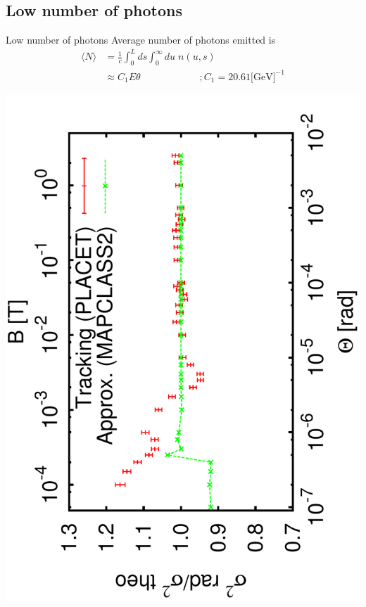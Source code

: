\documentclass{beamer}
\begin{document}
\subsection{Low number of photons}
\begin{frame}{Low number of photons}
Average number of photons emitted is
\begin{align}
 \langle N\rangle&= \frac{1}{c} \int_0^L ds \int_0^\infty du\; n(u,s)\\
 &\approx C_1E\theta\qquad\qquad\qquad;C_1=20.61\text{[GeV]}^{-1}
\end{align}
\par
\includegraphics[scale=0.24,angle=-90]{sigma_angle_r06.pdf}

\end{frame}
\end{document}
